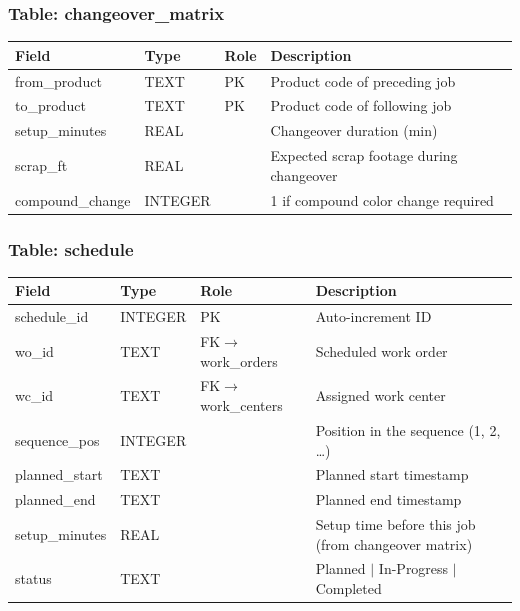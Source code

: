 \documentclass[11pt]{article}
\begin{document}
\subsubsection*{Table: changeover\_matrix}
\begin{table}[H]\centering\small
\begin{tabular}{@{} l l l L{6cm} @{}}
\toprule
\textbf{Field} & \textbf{Type} & \textbf{Role} & \textbf{Description} \\
\midrule
from\_product    & TEXT & PK  & Product code of preceding job \\
to\_product      & TEXT & PK  & Product code of following job \\
setup\_minutes   & REAL &     & Changeover duration (min) \\
scrap\_ft        & REAL &     & Expected scrap footage during changeover \\
compound\_change & INTEGER &  & 1 if compound color change required \\
\bottomrule
\end{tabular}
\end{table}

\subsubsection*{Table: schedule}
\begin{table}[H]\centering\small
\begin{tabular}{@{} l l l L{5.5cm} @{}}
\toprule
\textbf{Field} & \textbf{Type} & \textbf{Role} & \textbf{Description} \\
\midrule
schedule\_id     & INTEGER & PK  & Auto-increment ID \\
wo\_id           & TEXT    & FK$\to$work\_orders & Scheduled work order \\
wc\_id           & TEXT    & FK$\to$work\_centers & Assigned work center \\
sequence\_pos    & INTEGER &     & Position in the sequence (1, 2, \ldots) \\
planned\_start   & TEXT    &     & Planned start timestamp \\
planned\_end     & TEXT    &     & Planned end timestamp \\
setup\_minutes   & REAL    &     & Setup time before this job (from changeover matrix) \\
status           & TEXT    &     & Planned $\mid$ In-Progress $\mid$ Completed \\
\bottomrule
\end{tabular}
\end{table}
\end{document}
